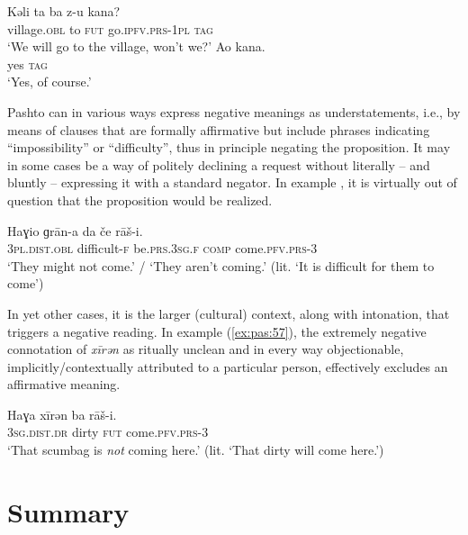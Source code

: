 \documentclass[output=paper,colorlinks,citecolor=brown]{langscibook}
\begin{document}
\ea\label{ex:pas:55}
    \begin{xlist}[Q: ]\label{ex:pas:55Q}
    \label{ex:pas:54Q}
        \gll Kəli ta ba z-u kana?\\
             village.\textsc{obl} to \textsc{fut} go.\textsc{ipfv.prs-1pl} \textsc{tag}\\
        \glt ‘We will go to the village, won’t we?’
    \label{ex:pas:55A}
        \gll Ao kana.\\
             yes \textsc{tag}\\
        \glt ‘Yes, of course.’
    \end{xlist}
\z 

Pashto can in various ways express negative meanings as understatements, i.e., by means of clauses that are formally affirmative but include phrases indicating “impossibility” or “difficulty”, thus in principle negating the proposition. It may in some cases be a way of politely declining a request without literally – and bluntly – expressing it with a standard negator. In example , it is virtually out of question that the proposition would be realized. 

\ea\label{ex:pas:56} 
    \gll  Haɣio ɡrān{}-a da če rāš{}-i. \\ 
         \textsc{3pl.dist.obl} difficult-\textsc{f} be.\textsc{prs.3sg.f} \textsc{comp} come.\textsc{pfv.prs{}-3} \\
    \glt ‘They might not come.’ / ‘They aren’t coming.’ (lit. ‘It is difficult for them to come’)
\z 

In yet other cases, it is the larger (cultural) context, along with intonation, that triggers a negative reading. In example (\ref{ex:pas:57}), the extremely negative connotation of \textit{xīrən} as ritually unclean and in every way objectionable, implicitly/contextually attributed to a particular person, effectively excludes an affirmative meaning.

\ea\label{ex:pas:57} 
    \gll Haɣa x\={i}rən ba rāš{}-i.\\ 
    \textsc{3sg.dist.dr} dirty \textsc{fut} come.\textsc{pfv.prs{}-3} \\
    \glt ‘That scumbag is \textit{not} coming here.’ (lit. ‘That dirty will come here.’)
\z 

\section{Summary}\label{sec:pas:5}
\end{document}
